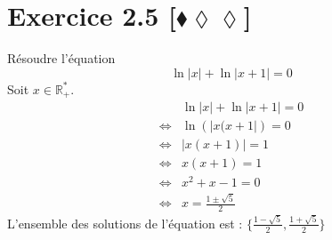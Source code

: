 \documentclass[10pt]{article}
\begin{document}
\section*{Exercice 2.5 [$\blacklozenge\lozenge\lozenge$]}
\begin{tcolorbox}[enhanced, width=6in, center, size=fbox, fontupper=\large, drop shadow southwest]
    Résoudre l'équation
    \begin{equation*}
        \ln|x|+\ln|x+1|=0
    \end{equation*}
    Soit $x\in\mathbb{R}^*_+$.
    \begin{align*}
        &\ln|x|+\ln|x+1|=0\\
        \iff&\ln\left(|x(x+1|\right)=0\\
        \iff&|x(x+1)|=1\\
        \iff&x(x+1)=1\\
        \iff&x^2+x-1=0\\
        \iff&x=\frac{1\pm\sqrt{5}}{2}
    \end{align*}
    L'ensemble des solutions de l'équation est : $\{\frac{1-\sqrt{5}}{2},\frac{1+\sqrt{5}}{2}\}$
\end{tcolorbox}
\end{document}
